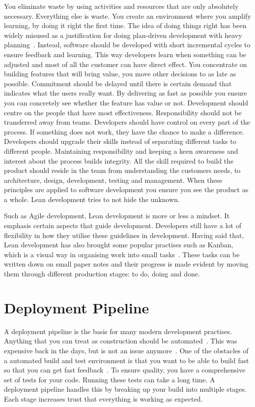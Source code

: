 \documentclass[english]{tktltiki2}
\begin{document}
You eliminate waste by using activities and resources that are only absolutely necessary. Everything else is waste. You create an environment where you amplify learning, by doing it right the first time. The idea of doing things right has been widely misused as a justification for doing plan-driven development with heavy planning~\cite{Pop02}. Instead, software should be developed with short incremental cycles to ensure feedback and learning. This way developers learn when something can be adjusted and most of all the customer can have direct effect. You concentrate on building features that will bring value, you move other decisions to as late as possible. Commitment should be delayed until there is certain demand that indicates what the users really want. By delivering as fast as possible you ensure you can concretely see whether the feature has value or not. Development should centre on the people that have most effectiveness. Responsibility should not be transferred away from teams. Developers should have control on every part of the process. If something does not work, they have the chance to make a difference. Developers should upgrade their skills instead of separating different tasks to different people. Maintaining responsibility and keeping a keen awareness and interest about the process builds integrity. All the skill required to build the product should reside in the team from understanding the customers needs, to architecture, design, development, testing and management. When these principles are applied to software development you ensure you see the product as a whole. Lean development tries to not hide the unknown.

Such as Agile development, Lean development is more or less a mindset. It emphasis certain aspects that guide development. Developers still have a lot of flexibility in how they utilise these guidelines in development. Having said that, Lean development has also brought some popular practises such as Kanban, which is a visual way in organising work into small tasks~\cite{Mon12}. These tasks can be written down on small paper notes and their progress is made evident by moving them through different production stages: to do, doing and done.


\section{Deployment Pipeline}

A deployment pipeline is the basis for many modern development practises. Anything that you can treat as construction should be automated~\cite{Fow05}. This was expensive back in the days, but is not an issue anymore~\cite{Roy70}. One of the obstacles of a automated build and test environment is that you want to be able to build fast so that you can get fast feedback~\cite{Fow13b}. To ensure quality, you have a comprehensive set of tests for your code. Running these tests can take a long time. A deployment pipeline handles this by breaking up your build into multiple stages. Each stage increases trust that everything is working as expected.
\end{document}
